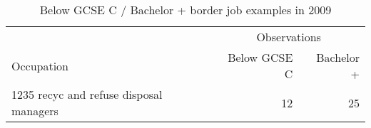 \begin{table}[h!]
	\centering
	\caption{Below GCSE C / Bachelor + border job examples in 2009}
	\begin{tabular}{lrr}
	\toprule
	\toprule
	&\multicolumn{2}{c}{Observations}\\
	Occupation&Below GCSE C &Bachelor +\\
\hline
1235 recyc and refuse disposal managers&12&25 \\
\bottomrule
\bottomrule
\end{tabular}
\end{table}
